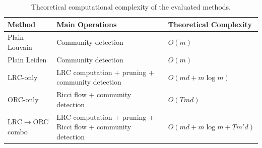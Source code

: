 \begin{table}
\caption{Theoretical computational complexity of the evaluated methods.}
\label{tab:facebook_theoretical_complexity}
\begin{tabular}{lll}
\toprule
Method & Main Operations & Theoretical Complexity \\
\midrule
Plain Louvain & Community detection & $O(m)$ \\
Plain Leiden & Community detection & $O(m)$ \\
LRC-only & LRC computation + pruning + community detection & $O(md + m\log m)$ \\
ORC-only & Ricci flow + community detection & $O(Tmd)$ \\
LRC$\rightarrow$ORC combo & LRC computation + pruning + Ricci flow + community detection & $O(md + m\log m + Tm'd)$ \\
\bottomrule
\end{tabular}
\end{table}
